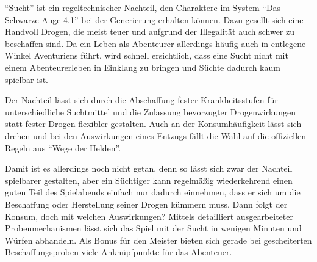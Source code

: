\enquote{Sucht} ist ein regeltechnischer Nachteil, den Charaktere im System \enquote{Das Schwarze Auge 4.1} bei der Generierung erhalten können. Dazu gesellt sich eine Handvoll Drogen, die meist teuer und aufgrund der Illegalität auch schwer zu beschaffen sind. Da ein Leben als Abenteurer allerdings häufig auch in entlegene Winkel Aventuriens führt, wird schnell ersichtlich, dass eine Sucht nicht mit einem Abenteurerleben in Einklang zu bringen und Süchte dadurch kaum spielbar ist.

Der Nachteil lässt sich durch die Abschaffung fester Krankheitsstufen für unterschiedliche Suchtmittel und die Zulassung bevorzugter Drogenwirkungen statt fester Drogen flexibler gestalten. Auch an der Konsumhäufigkeit lässt sich drehen und bei den Auswirkungen eines Entzugs fällt die Wahl auf die offiziellen Regeln aus \enquote{Wege der Helden}.

Damit ist es allerdings noch nicht getan, denn so lässt sich zwar der Nachteil spielbarer gestalten, aber ein Süchtiger kann regelmäßig wiederkehrend einen guten Teil des Spielabends einfach nur dadurch einnehmen, dass er sich um die Beschaffung oder Herstellung seiner Drogen kümmern muss. Dann folgt der Konsum, doch mit welchen Auswirkungen? Mittels detailliert ausgearbeiteter Probenmechanismen lässt sich das Spiel mit der Sucht in wenigen Minuten und Würfen abhandeln. Als Bonus für den Meister bieten sich gerade bei gescheiterten Beschaffungsproben viele Anknüpfpunkte für das Abenteuer.
